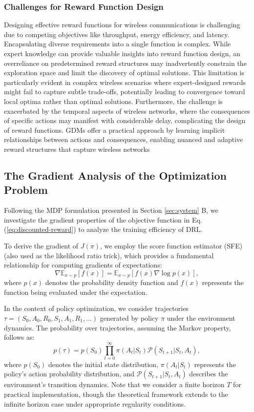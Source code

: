 \documentclass[comsoc,journal]{IEEEtran}
\begin{document}
\subsubsection{Challenges for Reward Function Design}
Designing effective reward functions for wireless communications is challenging due to competing objectives like throughput, energy efficiency, and latency. Encapsulating diverse requirements into a single function is complex. While expert knowledge can provide valuable insights into reward function design, an overreliance on predetermined reward structures may inadvertently constrain the exploration space and limit the discovery of optimal solutions. This limitation is particularly evident in complex wireless scenarios where expert-designed rewards might fail to capture subtle trade-offs, potentially leading to convergence toward local optima rather than optimal solutions. Furthermore, the challenge is exacerbated by the temporal aspects of wireless networks, where the consequences of specific actions may manifest with considerable delay, complicating the design of reward functions.
GDMs offer a practical approach by learning implicit relationships between actions and consequences, enabling nuanced and adaptive reward structures that capture wireless networks
\vspace{-8pt}
\subsection{The Gradient Analysis of the Optimization Problem}
Following the MDP formulation presented in Section \ref{sec:system} B, we investigate the gradient properties of the objective function in Eq. (\ref{eq:discounted-reward}) to analyze the training efficiency of DRL.

To derive the gradient of $J(\pi)$, we employ the score function estimator (SFE) (also used as the likelihood ratio trick), which provides a fundamental relationship for computing gradients of expectations:
\begin{equation}\label{eq:principle}
	 \nabla \mathbb{E}_{x \sim p} [f(x)] = \mathbb{E}_{x \sim p} \left[ f(x) \nabla \log p(x) \right], 
\end{equation}
where $p(x)$ denotes the probability density function and $f(x)$ represents the function being evaluated under the expectation.

In the context of policy optimization, we consider trajectories $\tau = (S_0, A_0, R_0, S_1, A_1, R_1, \dots)$ generated by policy $\pi$ under the environment dynamics. The probability over trajectories, assuming the Markov property, follows as:
\begin{equation} \label{eq:trajectory}
	p(\tau) = p(S_0) \prod_{t=0}^\infty \pi(A_t | S_t) \mathcal{P}(S_{t+1} | S_t, A_t), 
\end{equation}
where $p(S_0)$ denotes the initial state distribution, $\pi(A_t | S_t)$ represents the policy's action probability distribution, and $\mathcal{P}(S_{t+1} | S_t, A_t)$ describes the environment's transition dynamics. Note that we consider a finite horizon $T$ for practical implementation, though the theoretical framework extends to the infinite horizon case under appropriate regularity conditions.
\end{document}
